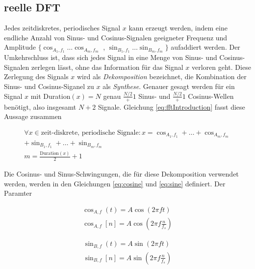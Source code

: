 \subsection{reelle DFT}

Jedes zeitdiskretes, periodisches Signal $x$ kann erzeugt werden, indem eine endliche Anzahl von Sinus- und Cosinus-Signalen geeigneter Frequenz und Amplitude $\{\cos_{A_1,f_1} \ldots \cos_{A_m,f_m}$ , $\sin_{B_1,f_1} \ldots \sin_{B_m,f_m} \}$ aufaddiert werden. Der Umkehrschluss ist, dass sich jedes Signal in eine Menge von Sinus- und Cosinus-Signalen zerlegen lässt, ohne das Information für das Signal $x$ verloren geht. Diese Zerlegung des Signals $x$ wird als \emph{Dekomposition} bezeichnet, die Kombination der Sinus- und Cosinus-Siganel zu $x$ als \emph{Synthese}. Genauer gesagt werden für ein Signal $x$ mit Duration$(x) = N$ genau $\frac{N/2}+1$ Sinus- und $\frac{N/2}+1$ Cosinus-Wellen benötigt, also insgesamt $N+2$ Signale. Gleichung \ref{eq:fftIntroduction} fasst diese Aussage zusammen

\begin{equation}
\label{eq:fftIntroduction}
\begin{split}
\forall x  \in \text{zeit-diskrete, periodische Signale}: x =  \cos_{A_1,f_1} + \ldots + \cos_{A_m,f_m}  \\ + \sin_{B_1,f_1} + \ldots + \sin_{B_m,f_m}  \\
m = \frac{\text{Duration}(x)}{2} + 1 
\end{split}
\end{equation}


Die Cosinus- und Sinus-Schwingungen, die für diese Dekomposition verwendet werden, werden in den Gleichungen \ref{eq:cosine} und \ref{eq:sine} definiert. Der Paramter 

\begin{equation}
\label{eq:cosine}
\begin{split}
\cos_{A,f}(t) = A \cos(2\pi f t) \\
\cos_{A,f}[n] = A \cos(2\pi f \frac{n}{f_s})
\end{split}
\end{equation}

\begin{equation}
\label{eq:sine}
\begin{split}
\sin_{B,f} (t) = A \sin(2\pi f t) \\
\sin_{B,f}[n] = A \sin(2\pi f \frac{n}{f_s})
\end{split}
\end{equation}

